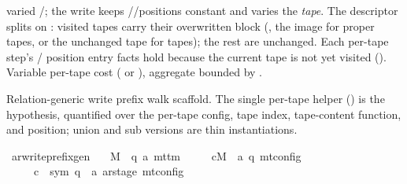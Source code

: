\begin{isabellebody}
\begin{isamarkuptext}
  varied /; the write keeps
  //positions constant and varies the
  \emph{tape}.  The descriptor splits on : visited tapes carry their overwritten block
  (, the  image for proper tapes, or
  the unchanged tape for  tapes); the rest are unchanged.
  Each per-tape step's  / position entry facts hold
  because the current tape is not yet visited
  ().  Variable
  per-tape cost ( or ), aggregate bounded by
  .%
\end{isamarkuptext}\isamarkuptrue%
%
\begin{isamarkuptext}%
Relation-generic write prefix walk scaffold.  The single
  per-tape helper () is the 
  hypothesis, quantified over the per-tape config, tape index,
  tape-content function, and position; union and sub versions are
  thin instantiations.%
\end{isamarkuptext}\isamarkuptrue%
\isamarkupfalse%
\ ar{\isacharunderscore}{\kern0pt}write{\isacharunderscore}{\kern0pt}prefix{\isacharunderscore}{\kern0pt}gen{\isacharcolon}{\kern0pt}\isanewline
\ \ \ M\ {\isacharcolon}{\kern0pt}{\isacharcolon}{\kern0pt}\ {\isachardoublequoteopen}{\isacharparenleft}{\kern0pt}{\isacharprime}{\kern0pt}q{\isacharcomma}{\kern0pt}\ {\isacharprime}{\kern0pt}a{\isacharparenright}{\kern0pt}\ mttm{\isachardoublequoteclose}\isanewline
\ \ \ \ \ cM\ {\isacharcolon}{\kern0pt}{\isacharcolon}{\kern0pt}\ {\isachardoublequoteopen}{\isacharparenleft}{\kern0pt}{\isacharprime}{\kern0pt}a{\isacharcomma}{\kern0pt}\ {\isacharprime}{\kern0pt}q{\isacharparenright}{\kern0pt}\ mt{\isacharunderscore}{\kern0pt}config{\isachardoublequoteclose}\isanewline
\ \ \ \ \ c{}\ {\isacharcolon}{\kern0pt}{\isacharcolon}{\kern0pt}\ {\isachardoublequoteopen}{\isacharparenleft}{\kern0pt}sym{}{\isacharcomma}{\kern0pt}\ {\isacharprime}{\kern0pt}q\ {\isasymtimes}\ {\isacharprime}{\kern0pt}a\ ar{\isacharunderscore}{\kern0pt}stage{\isacharparenright}{\kern0pt}\ mt{\isacharunderscore}{\kern0pt}config{\isachardoublequoteclose}\isanewline

\end{isabellebody}

